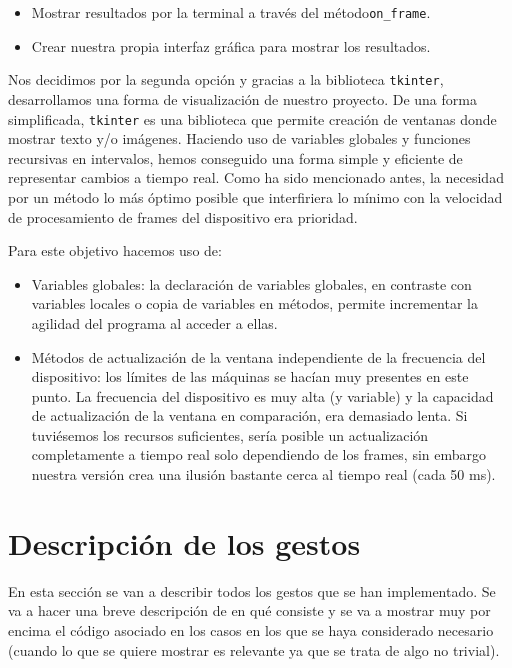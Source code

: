 \documentclass[11pt,a4paper]{article}
\begin{document}
\begin{itemize}[label=\textbullet]
	\item Mostrar resultados por la terminal a través del método\texttt{on\_frame}.
	\item Crear nuestra propia interfaz gráfica para mostrar los resultados.
\end{itemize}

Nos decidimos por la segunda opción y gracias a la biblioteca \texttt{tkinter}, desarrollamos una forma de visualización de nuestro proyecto.
De una forma simplificada, \texttt{tkinter} es una biblioteca que permite creación de ventanas donde mostrar texto y/o imágenes. Haciendo uso de variables globales y funciones recursivas en intervalos, hemos conseguido una forma simple y eficiente de representar cambios a tiempo real.
Como ha sido mencionado antes, la necesidad por un método lo más óptimo posible que interfiriera lo mínimo con la velocidad de procesamiento de frames del dispositivo era prioridad. 

Para este objetivo hacemos uso de:

\begin{itemize}[label=\textbullet]
	\item Variables globales: la declaración de variables globales, en contraste con variables locales o copia de variables en métodos, permite incrementar la agilidad del programa al acceder a ellas.
	\item Métodos de actualización de la ventana independiente de la frecuencia del dispositivo: los límites de las máquinas se hacían muy presentes en este punto. La frecuencia del dispositivo es muy alta (y variable) y la capacidad de actualización de la ventana en comparación, era demasiado lenta. Si tuviésemos los recursos suficientes, sería posible un actualización completamente a tiempo real solo dependiendo de los frames, sin embargo nuestra versión crea una ilusión bastante cerca al tiempo real (cada 50 ms).
\end{itemize}

\section{Descripción de los gestos}

En esta sección se van a describir todos los gestos que se han implementado. Se va
a hacer una breve descripción de en qué consiste y se va a mostrar muy por encima
el código asociado en los casos en los que se haya considerado necesario (cuando
lo que se quiere mostrar es relevante ya que se trata de algo no trivial).
\end{document}
